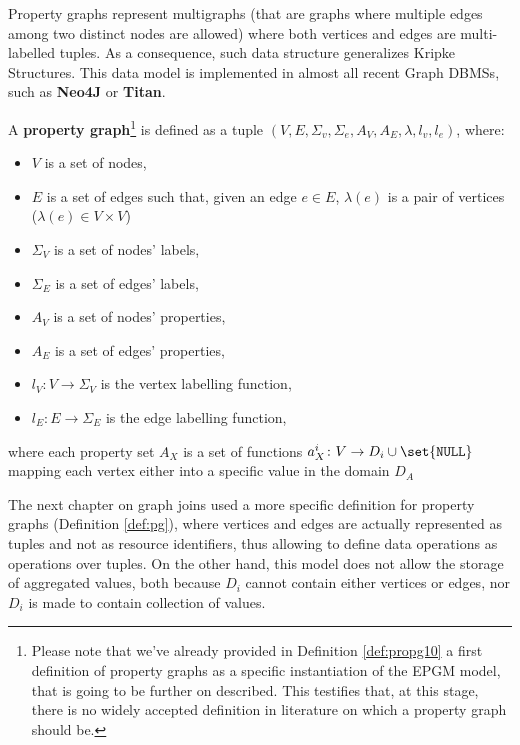 Property graphs represent multigraphs (that are graphs where multiple edges among two distinct nodes are allowed) where both vertices and edges are multi-labelled tuples. As a consequence, such data structure generalizes Kripke Structures.  This data model is implemented in almost all recent  Graph DBMSs, such as \textbf{Neo4J} \cite{Robinson} or \textbf{Titan}. 

\begin{definition}
	A \textbf{property graph}\footnote{Please note that we've already provided in Definition \vref{def:propg10} a first definition of property graphs as a specific instantiation of the EPGM model, that is going to be further on described. This testifies that, at this stage, there is no widely accepted definition in literature on which a property graph should be.} \cite{Neo4jAlg} is defined as a tuple $(V,E,\Sigma_v,\Sigma_e,A_V,A_E,\lambda,l_v,l_e)$, where:
	\begin{itemize}
		\item $V$ is a set of nodes,
		\item $E$ is a set of edges such that, given an edge $e\in E$, $\lambda(e)$ is a pair of vertices ($\lambda(e)\in V\times V$)
		\item $\Sigma_V$ is a set of nodes' labels,
		\item $\Sigma_E$ is a set of edges' labels,
		\item $A_V$ is a set of nodes' properties,
		\item $A_E$ is a set of edges' properties,
		\item $l_V\colon V\to \Sigma_V$ is the vertex labelling function,
		\item $l_E\colon E\to \Sigma_E$ is the edge labelling function,
	\end{itemize}
	where each property set $A_X$ is a set of functions $a_X^i\colon V\to D_i\cup\set{\texttt{NULL}}$ mapping each
	vertex either into a specific value in the domain $D_{A}$ \qedsymbol
\end{definition}

The next chapter on graph joins used a more specific definition for property graphs (Definition \vref{def:pg}), where vertices and edges are actually represented as tuples and not as resource identifiers, thus allowing to define data operations as operations over tuples. On the other hand, this model does not allow the storage of aggregated values, both because $D_i$ cannot contain either vertices or edges, nor $D_i$ is made to contain collection of values.